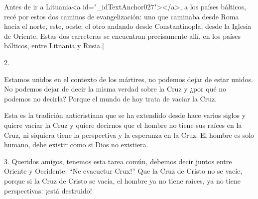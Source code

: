 			\begin{body}\begin{bodysmall}Antes de ir a Lituania<a id="_idTextAnchor027"></a>, a los países bálticos, recé por estos dos caminos de evangelización: uno que caminaba desde Roma hacia el norte, este, oeste; el otro andando desde Constantinopla, desde la Iglesia de Oriente. Estas dos carreteras se encuentran precisamente allí, en los países bálticos, entre Lituania y Rusia.]\end{bodysmall}\end{body}
			
			\begin{body}2. \begin{bodysmall}\end{bodysmall}\end{body}
			
			\begin{body}Estamos unidos en el contexto de los mártires, no podemos dejar de estar unidos. No podemos dejar de decir la misma verdad sobre la Cruz y ¿por qué no podemos no decirla? Porque el mundo de hoy trata de vaciar la Cruz. \end{body}
			
			\begin{body}Esta es la tradición anticristiana que se ha extendido desde hace varios siglos y quiere vaciar la Cruz y quiere decirnos que el hombre no tiene sus raíces en la Cruz, ni siquiera tiene la perspectiva y la esperanza en la Cruz. El hombre es solo humano, debe existir como si Dios no existiera. \end{body}
			
			\begin{body}3. Queridos amigos, tenemos esta tarea común, debemos decir juntos entre Oriente y Occidente: “Ne evacuetur Crux!” Que la Cruz de Cristo no se vacíe, porque si la Cruz de Cristo se vacía, el hombre ya no tiene raíces, ya no tiene perspectivas: ¡está destruido! \end{body}
			

